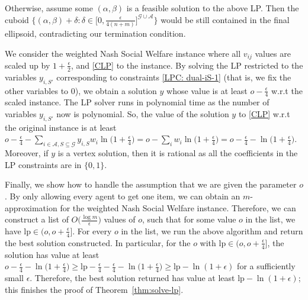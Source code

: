 \documentclass[10pt,a4paper]{article}
\theoremstyle{definition}
\theoremstyle{plain}
\newcommand\calA{{\mathcal{A}}}
\newcommand\calG{{\mathcal{G}}}
\newcommand{\lp}{\mathrm{lp}}
\begin{document}
    Otherwise, assume some $(\alpha, \beta)$ is a feasible solution to the above LP. Then the cuboid $\Big\{(\alpha, \beta) + \delta : \delta \in \big[0, \frac{\epsilon}{4(n+m)}\big]^{\calG \cup \calA}\Big\}$ would be still contained in the final ellipsoid, contradicting our termination condition. 

    
    We consider the weighted Nash Social Welfare instance where all $v_{ij}$ values are scaled up by $1+\frac\epsilon 2$, and \eqref{CLP} to the instance. By solving the LP restricted to the variables $y_{i, S'}$ corresponding to constraints \eqref{LPC: dual-iS-1} (that is, we fix the other variables to $0$), we obtain a solution $y$ whose value is at least $o - \frac\epsilon 4$ w.r.t the scaled instance. The LP solver runs in polynomial time as the number of variables $y_{i, S'}$ now is polynomial.  So, the value of the solution $y$ to \eqref{CLP} w.r.t the original instance is at least $o - \frac\epsilon 4 - \sum_{i \in \calA, S \subseteq \calG} y_{i, S}w_i\ln\big(1+\frac\epsilon 4\big) = o - \sum_{i} w_i\ln\big(1+\frac\epsilon 4\big) = o - \frac\epsilon 4- \ln\big(1+\frac\epsilon 4\big)$. Moreover, if $y$ is a vertex solution, then it is rational as all the coefficients in the LP constraints are in $\{0, 1\}$.  


    Finally, we show how to handle the assumption that we are given the parameter $o$. By only allowing every agent to get one item, we can obtain an $m$-approximation for the weighted Nash Social Welfare instance. Therefore, we can construct a list of $O\Big(\frac{\log m}{\epsilon}\Big)$ values of $o$, such that for some value $o$ in the list, we have $\lp \in (o, o + \frac\epsilon 4]$. For every $o$ in the list, we run the above algorithm and return the best solution constructed. In particular, for the $o$ with $\lp \in (o, o + \frac\epsilon 4]$, the solution has value at least $o - \frac\epsilon 4 - \ln\big(1+\frac\epsilon 4\big) \geq \lp - \frac\epsilon 4 - \frac\epsilon 4 - \ln\big(1+\frac\epsilon 4\big) \geq \lp - \ln(1+\epsilon)$ for a sufficiently small $\epsilon$. Therefore, the best solution returned has value at least $\lp - \ln(1+\epsilon)$; this finishes the proof of Theorem~\ref{thm:solve-lp}.

 



\end{document}
